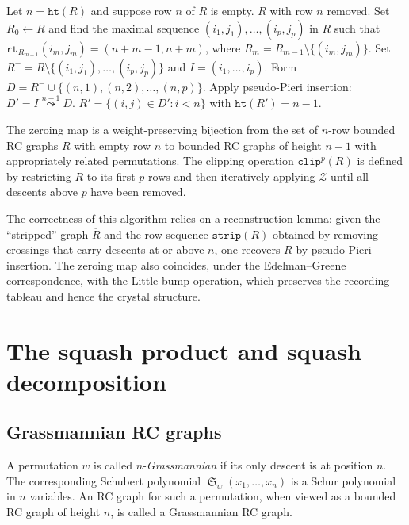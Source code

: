 \documentclass{amsart}
\theoremstyle{definition}
\theoremstyle{remark}
\numberwithin{equation}{section}
\DeclareMathOperator{\sch}{\mathfrak{S}}
\newcommand{\hr}{\mathtt{ht}}
\newcommand{\zeromap}{\mathcal{Z}}
\newcommand{\ins}[2]{{#2\overset{#1}{\leadsto}}}
\begin{document}
\begin{algorithm}
\caption{The zeroing map $\zeromap(R)$}
\label{algorithm:zeroing}
\begin{algorithmic}[1]
\State Let $n = \hr(R)$ and suppose row $n$ of $R$ is empty.
  \State \Return $R$ with row $n$ removed.
\Else
  \State Set $R_0 \gets R$ and find the maximal sequence $(i_1, j_1), \ldots, (i_p, j_p)$ in $R$ such that $\mathtt{rt}_{R_{m-1}}(i_m, j_m) = (n + m - 1, n + m)$, where $R_m = R_{m-1} \setminus \{(i_m, j_m)\}$.
  \State Set $R^- = R \setminus \{(i_1, j_1), \ldots, (i_p, j_p)\}$ and $I = (i_1, \ldots, i_p)$.
  \State Form $D = R^- \cup \{(n, 1), (n, 2), \ldots, (n, p)\}$.
  \State Apply pseudo-Pieri insertion: $D' = \ins{n-1}{I} D$.
  \State \Return $R' = \{(i, j) \in D' : i < n\}$ with $\hr(R') = n - 1$.
\EndIf
\end{algorithmic}
\end{algorithm}

The zeroing map is a weight-preserving bijection from the set of $n$-row bounded RC graphs $R$ with empty row $n$ to bounded RC graphs of height $n - 1$ with appropriately related permutations.  The clipping operation $\mathtt{clip}^p(R)$ is defined by restricting $R$ to its first $p$ rows and then iteratively applying $\zeromap$ until all descents above $p$ have been removed.

The correctness of this algorithm relies on a reconstruction lemma: given the ``stripped'' graph $\overline{R}$ and the row sequence $\mathtt{strip}(R)$ obtained by removing crossings that carry descents at or above $n$, one recovers $R$ by pseudo-Pieri insertion.  The zeroing map also coincides, under the Edelman--Greene correspondence, with the Little bump operation, which preserves the recording tableau and hence the crystal structure.




\section{The squash product and squash decomposition}\label{section:squash}

\subsection{Grassmannian RC graphs}

A permutation $w$ is called $n$-\textit{Grassmannian} if its only descent is at position $n$.  The corresponding Schubert polynomial $\sch_w(x_1, \ldots, x_n)$ is a Schur polynomial in $n$ variables.  An RC graph for such a permutation, when viewed as a bounded RC graph of height $n$, is called a Grassmannian RC graph.
\end{document}
